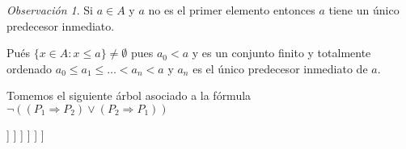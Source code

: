 \documentclass[a4paper,11pt]{article}
\theoremstyle{definition}
\theoremstyle{remark}
\newtheorem*{remk}{Observación}
\begin{document}
\begin{remk}
	Si $a \in A$ y $a$ no es el primer elemento entonces $a$ tiene un único predecesor
	inmediato.
	
	Pués $\{x \in A : x \le a\} \neq \emptyset$ pues $a_0 < a$ y es un conjunto finito
	y totalmente ordenado $a_0 \le a_1 \le \dots < a_n < a$ y $a_n$ es el único
	predecesor inmediato de $a$.
\end{remk}

Tomemos el siguiente árbol asociado a la fórmula $\neg((P_1 \Rightarrow P_2) \vee (P_2 \Rightarrow P_1))$

\begin{center}
	\begin{forest}
		[$\neg((P_1 \Rightarrow P_2) \vee (P_2 \Rightarrow P_1))$
			[$\neg(P_1 \Rightarrow P_2)$
				[$\neg(P_2 \Rightarrow P_1)$
					[$P_1$
						[$\neg P_2$
							[$P_2$
								[$\neg P_1$]
							]
						]
					]
				]
			]
		]
	\end{forest}
\end{center}
\end{document}

